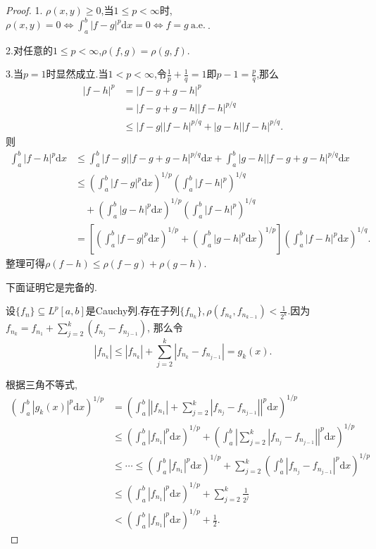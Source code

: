 \documentclass[a4paper,oneside,12pt]{ctexart}
\theoremstyle{plain}
\theoremstyle{nonumberplain}
\theoremstyle{nonumberplain}
\newtheorem{proof}{证明.}
\newcommand{\dif}{\mathrm{d}}
\newcommand{\abs}[1]{\left\vert#1\right\vert}
\renewcommand{\ae}{\ \mathrm{a.e.}\ }
\begin{document}
\begin{proof}
    1. $\rho(x,y)\geqslant 0$,当$1\leqslant p<\infty$时,$\rho(x,y)=0\Leftrightarrow \int_a^b\abs{f-g}^p\dif x=0\Leftrightarrow f=g\ae$.

    2.对任意的$1\leqslant p< \infty$,$\rho(f,g)=\rho(g,f)$.

    3.当$p=1$时显然成立.当$1<p<\infty$,令$\frac{1}{p}+\frac{1}{q}=1$即$p-1=\frac{p}{q}$,那么 
    \begin{align*}
        \abs{f-h}^p&=\abs{f-g+g-h}^p\\
        &=\abs{f-g+g-h}\abs{f-h}^{p/q}\\
        &\leqslant \abs{f-g}\abs{f-h}^{p/q}+\abs{g-h}\abs{f-h}^{p/q}.
    \end{align*}
    则 
    \begin{align*}
        \int_a^b\abs{f-h}^p\dif x&\leqslant \int_a^b\abs{f-g}\abs{f-g+g-h}^{p/q}\dif x+\int_a^b\abs{g-h}\abs{f-g+g-h}^{p/q}\dif x\\
        &\leqslant \left(\int_a^b\abs{f-g}^p\dif x\right)^{1/p}\left(\int_a^b\abs{f-h}^p\right)^{1/q}\\
        &\quad +\left(\int_a^b\abs{g-h}^p\dif x\right)^{1/p}\left(\int_a^b\abs{f-h}^p\right)^{1/q}\\
        &=\left[\left(\int_a^b\abs{f-g}^p\dif x\right)^{1/p}+\left(\int_a^b\abs{g-h}^p\dif x\right)^{1/p}\right]\left(\int_a^b\abs{f-h}^p\dif x\right)^{1/q}.
    \end{align*}
    整理可得$\rho(f-h)\leqslant\rho(f-g)+\rho(g-h)$.

    下面证明它是完备的.

    设$\{f_n\}\subseteq L^p[a,b]$是Cauchy列.存在子列$\{f_{n_k}\},\rho(f_{n_k},f_{n_{k-1}})<\frac{1}{2^k}$.因为$f_{n_k}=f_{n_1}+\sum_{j=2}^k(f_{n_j}-f_{n_{j-1}})$,
    那么令
    \begin{equation*}
        \abs{f_{n_k}}\leqslant\abs{f_{n_k}}+\sum_{j=2}^k\abs{f_{n_k}-f_{n_{j-1}}}=g_k(x).
    \end{equation*}

    根据三角不等式,
    \begin{align*}
        \left(\int_a^b\abs{g_k(x)}^p\dif x\right)^{1/p}&=\left(\int_a^b\abs{\abs{f_{n_1}}+\sum_{j=2}^k\abs{f_{n_j}-f_{n_{j-1}}}}^p\dif x\right)^{1/p}\\
        &\leqslant \left(\int_a^b\abs{f_{n_1}}^p\dif x\right)^{1/p}+\left(\int_a^b\abs{\sum_{j=2}^k\abs{f_{n_j}-f_{n_{j-1}}}}^p\dif x\right)^{1/p}\\
        &\leqslant\cdots\leqslant \left(\int_a^b\abs{f_{n_1}}^p\dif x\right)^{1/p}+\sum_{j=2}^k\left(\int_a^b\abs{f_{n_j}-f_{n_{j-1}}}^p\dif x\right)^{1/p}\\
        &\leqslant \left(\int_a^b\abs{f_{n_1}}^p\dif x\right)^{1/p}+\sum_{j=2}^k\frac{1}{2^j}\\
        &<\left(\int_a^b\abs{f_{n_1}}^p\dif x\right)^{1/p}+\frac{1}{2}.
    \end{align*}


\end{proof}
\end{document}
